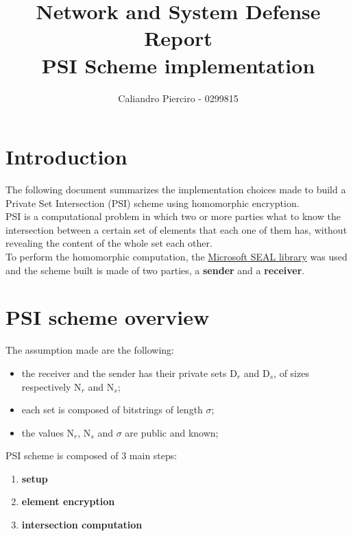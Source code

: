 \documentclass[10pt]{extarticle}
\title{Network and System Defense Report\\PSI Scheme implementation}
\author{Caliandro Pierciro - 0299815}
\begin{document}
\maketitle
\tableofcontents
\newpage

\section{Introduction}
The following document summarizes the implementation choices made to build a Private Set Intersection (PSI) scheme using homomorphic encryption.\\
PSI is a computational problem in which two or more parties what to know the intersection between a certain set of elements that each one of them has, without revealing the content of the whole set each other.\\
To perform the homomorphic computation, the \href{https://github.com/Microsoft/SEAL}{Microsoft SEAL library} was used and the scheme built is made of two parties, a \textbf{sender} and a \textbf{receiver}.
\section{PSI scheme overview}
The assumption made are the following:
\begin{itemize}
	\item the receiver and the sender has their private sets D$_r$ and D$_s$, of sizes respectively N$_r$ and N$_s$;
	\item each set is composed of bitstrings of length $\sigma$;
	\item the values N$_r$, N$_s$ and $\sigma$ are public and known;
\end{itemize}

PSI scheme is composed of 3 main steps:
\begin{enumerate}
	\item \textbf{setup}
	\item \textbf{element encryption}
	\item \textbf{intersection computation}
\end{enumerate}
\end{document}
